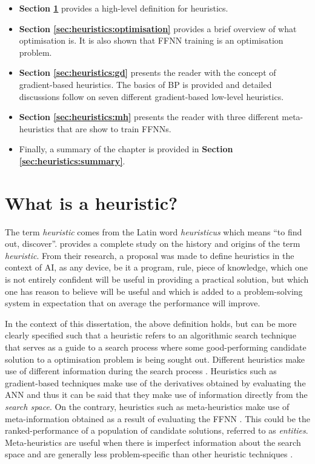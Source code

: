 \begin{itemize}
    \item \textbf{Section \ref{sec:heuristics:what_is_a_heuristic}} provides a high-level definition for heuristics.

    \item \textbf{Section \ref{sec:heuristics:optimisation}} provides a brief overview of what optimisation is. It is also shown that \ac{FFNN} training is an optimisation problem.
    
    \item \textbf{Section \ref{sec:heuristics:gd}} presents the reader with the concept of gradient-based heuristics. The basics of \ac{BP} is provided and detailed discussions follow on seven different gradient-based low-level heuristics.
    
    \item \textbf{Section \ref{sec:heuristics:mh}} presents the reader with three different meta-heuristics that are show to train \acp{FFNN}.
    
    \item Finally, a summary of the chapter is provided in \textbf{Section \ref{sec:heuristics:summary}}.
\end{itemize}

\section{What is a heuristic?}
\label{sec:heuristics:what_is_a_heuristic}

The term \textit{heuristic} comes from the Latin word \textit{heuristicus} which means ``to find out, discover''. \citeauthor{ref:romanycia:1985} \cite{ref:romanycia:1985} provides a complete study on the history and origins of the term \textit{heuristic}. From their research, a proposal was made to define heuristics in the context of 
\ac{AI}, as any device, be it a program, rule, piece of knowledge, which one is not entirely confident will be useful in providing a practical solution, but which one has reason to believe will be useful and which is added to a problem-solving system in expectation that on average the performance will improve.

In the context of this dissertation, the above definition holds, but can be more clearly specified such that a heuristic refers to an algorithmic search technique that serves as a guide to a search process where some good-performing candidate solution to a optimisation problem is being sought out. Different heuristics make use of different information during the search process \cite{ref:kheiri:2017}. Heuristics such as gradient-based techniques make use of the derivatives obtained by evaluating the \ac{ANN} and thus it can be said that they make use of information directly from the \textit{search space}. On the contrary, heuristics such as meta-heuristics make use of meta-information obtained as a result of evaluating the \ac{FFNN} \cite{ref:blum:2003}. This could be the ranked-performance of a population of candidate solutions, referred to as \textit{entities}. Meta-heuristics are useful when there is imperfect information about the search space \cite{ref:bianchi:2009} and are generally less problem-specific than other heuristic techniques \cite{ref:blum:2003}.

